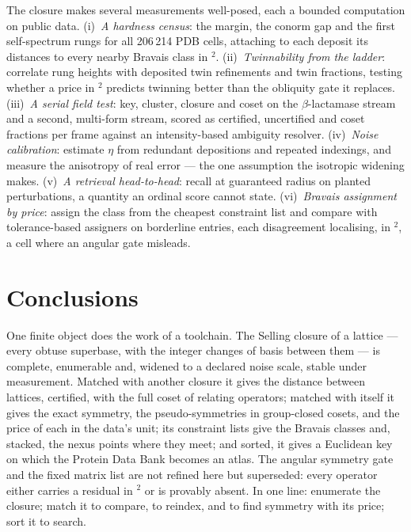 \documentclass[preprint,pdf]{iucr}          %
\newcommand{\Ang}{\text{\AA}}
\begin{document}
The closure makes several measurements well-posed, each a bounded computation on public data. (i)~\emph{A hardness census}: the margin, the conorm gap and the first self-spectrum rungs for all 206\,214 PDB cells, attaching to each deposit its distances to every nearby Bravais class in \Ang$^2$. (ii)~\emph{Twinnability from the ladder}: correlate rung heights with deposited twin refinements and twin fractions, testing whether a price in \Ang$^2$ predicts twinning better than the obliquity gate it replaces. (iii)~\emph{A serial field test}: key, cluster, closure and coset on the $\beta$-lactamase stream and a second, multi-form stream, scored as certified, uncertified and coset fractions per frame against an intensity-based ambiguity resolver. (iv)~\emph{Noise calibration}: estimate $\eta$ from redundant depositions and repeated indexings, and measure the anisotropy of real error --- the one assumption the isotropic widening makes. (v)~\emph{A retrieval head-to-head}: recall at guaranteed radius on planted perturbations, a quantity an ordinal score cannot state. (vi)~\emph{Bravais assignment by price}: assign the class from the cheapest constraint list and compare with tolerance-based assigners on borderline entries, each disagreement localising, in \Ang$^2$, a cell where an angular gate misleads.

\section{Conclusions}

One finite object does the work of a toolchain. The Selling closure of a lattice --- every obtuse superbase, with the integer changes of basis between them --- is complete, enumerable and, widened to a declared noise scale, stable under measurement. Matched with another closure it gives the distance between lattices, certified, with the full coset of relating operators; matched with itself it gives the exact symmetry, the pseudo-symmetries in group-closed cosets, and the price of each in the data's unit; its constraint lists give the Bravais classes and, stacked, the nexus points where they meet; and sorted, it gives a Euclidean key on which the Protein Data Bank becomes an atlas. The angular symmetry gate and the fixed matrix list are not refined here but superseded: every operator either carries a residual in \Ang$^2$ or is provably absent. In one line: enumerate the closure; match it to compare, to reindex, and to find symmetry with its price; sort it to search.
\end{document}

